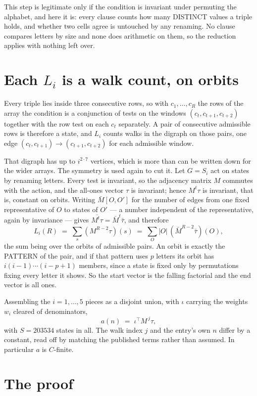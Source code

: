 \documentclass[11pt,a4paper]{article}
\theoremstyle{plain}
\theoremstyle{definition}
\begin{document}
This step is legitimate only if the condition is invariant under permuting the alphabet, and
here it is: every clause counts how many DISTINCT values a triple holds, and whether two cells
agree is untouched by any renaming. No clause compares letters by size and none does arithmetic
on them, so the reduction applies with nothing left over.

\section{Each $L_i$ is a walk count, on orbits}

Every triple lies inside three consecutive rows, so with $c_1,\dots,c_R$ the rows of the array
the condition is a conjunction of tests on the windows $(c_{t},c_{t+1},c_{t+2})$ together
with the row test on each $c_t$ separately. A pair of consecutive admissible rows is therefore
a state, and $L_i$ counts walks in the digraph on those pairs, one edge $(c_t,c_{t+1})\to
(c_{t+1},c_{t+2})$ for each admissible window.

That digraph has up to $i^{2\cdot7}$ vertices, which is more than can be written down for
the wider arrays. The symmetry is used again to cut it. Let $G=S_i$ act on states by renaming
letters. Every test is invariant, so the adjacency matrix $M$ commutes with the action, and the
all-ones vector $\tau$ is invariant; hence $M^{t}\tau$ is invariant, that is, constant on
orbits. Writing $\bar M[O,O']$ for the number of edges from one fixed representative of $O$ to
states of $O'$ --- a number independent of the representative, again by invariance --- gives
$\overline{M^{t}\tau}=\bar M^{t}\bar\tau$, and therefore
\[
L_i(R)\;=\;\sum_{s}(M^{R-2}\tau)(s)\;=\;\sum_{O}|O|\,(\bar M^{R-2}\bar\tau)(O),
\]
the sum being over the orbits of admissible pairs. An orbit is exactly the PATTERN of the pair,
and if that pattern uses $p$ letters its orbit has $i(i-1)\cdots(i-p+1)$ members, since a state
is fixed only by permutations fixing every letter it shows. So the start vector is the falling
factorial and the end vector is all ones.

Assembling the $i=1,\dots,5$ pieces as a disjoint union, with $\iota$ carrying the weights
$w_i$ cleared of denominators,
\[
a(n)\;=\;\iota^{\!\top}M^{\,j}\tau ,
\]
with $S=203534$ states in all. The walk index $j$ and the entry's own $n$ differ by a constant,
read off by matching the published terms rather than assumed. In particular $a$ is $C$-finite.

\section{The proof}
\end{document}
